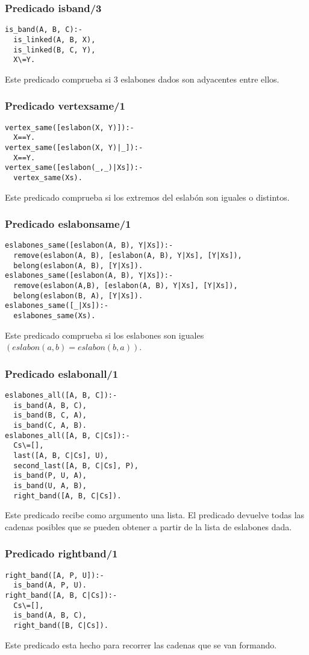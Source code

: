 \documentclass[11pt, a4paper]{article}
\begin{document}
\subsubsection{Predicado isband/3}
\begin{lstlisting}[frame=single]
is_band(A, B, C):-
  is_linked(A, B, X),
  is_linked(B, C, Y),
  X\=Y.
\end{lstlisting}
Este predicado comprueba si 3 eslabones dados son adyacentes entre ellos.
\subsubsection{Predicado vertexsame/1}
\begin{lstlisting}[frame=single]
vertex_same([eslabon(X, Y)]):- 
  X==Y.
vertex_same([eslabon(X, Y)|_]):- 
  X==Y.
vertex_same([eslabon(_,_)|Xs]):- 
  vertex_same(Xs).
\end{lstlisting}
Este predicado comprueba si los extremos del eslabón son iguales o distintos.
\subsubsection{Predicado eslabonsame/1}
\begin{lstlisting}[frame=single]
eslabones_same([eslabon(A, B), Y|Xs]):-
  remove(eslabon(A, B), [eslabon(A, B), Y|Xs], [Y|Xs]),
  belong(eslabon(A, B), [Y|Xs]).
eslabones_same([eslabon(A, B), Y|Xs]):-
  remove(eslabon(A,B), [eslabon(A, B), Y|Xs], [Y|Xs]),
  belong(eslabon(B, A), [Y|Xs]).
eslabones_same([_|Xs]):-
  eslabones_same(Xs).
\end{lstlisting}
Este predicado comprueba si los eslabones son iguales $(eslabon(a,b)=eslabon(b,a))$.
\subsubsection{Predicado eslabonall/1}
\begin{lstlisting}[frame=single]
eslabones_all([A, B, C]):-
  is_band(A, B, C),
  is_band(B, C, A),
  is_band(C, A, B).
eslabones_all([A, B, C|Cs]):-
  Cs\=[],
  last([A, B, C|Cs], U),
  second_last([A, B, C|Cs], P),
  is_band(P, U, A),
  is_band(U, A, B),
  right_band([A, B, C|Cs]).	
\end{lstlisting}
Este predicado recibe como argumento una lista.
El predicado devuelve todas las cadenas posibles que se pueden obtener a partir de la lista de eslabones dada.
\subsubsection{Predicado rightband/1}
\begin{lstlisting}[frame=single]
right_band([A, P, U]):-
  is_band(A, P, U).
right_band([A, B, C|Cs]):-
  Cs\=[],
  is_band(A, B, C),
  right_band([B, C|Cs]).
\end{lstlisting}
Este predicado esta hecho para recorrer las cadenas que se van formando.
\end{document}
